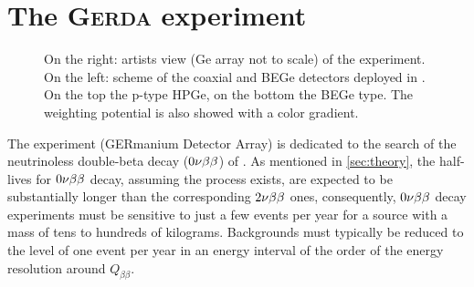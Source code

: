 \section[The \textsc{Gerda} experiment]{The \textsc{Gerda} experiment}\label{sec:gerda}
\begin{figure}[b!]
	\centering
\caption{On the right: artists view (Ge array not to scale) of the {\gerda} experiment. On the left: scheme of the coaxial and BEGe detectors deployed in {\gerda}. On the top the p-type HPGe, on the bottom the BEGe type. The weighting potential is also showed with a color gradient.}
	\label{fig:artistviewanddet}
\end{figure}
The {\gerda} experiment \cite{gerdadescription} (GERmanium Detector Array) is dedicated to the search of the neutrinoless double-beta decay ($0\nu\beta\beta$) of . As mentioned in \cref{sec:theory}, the half-lives for $0\nu\beta\beta$ decay, assuming the process exists, are expected to be substantially longer than the corresponding $2\nu\beta\beta$ ones, consequently, $0\nu\beta\beta$ decay experiments must be sensitive to just a few events per year for a source with a mass of tens to hundreds of kilograms. Backgrounds must typically be reduced to the level of one event per year in an energy interval of the order of the energy resolution around $Q_{\beta\beta}$. 

